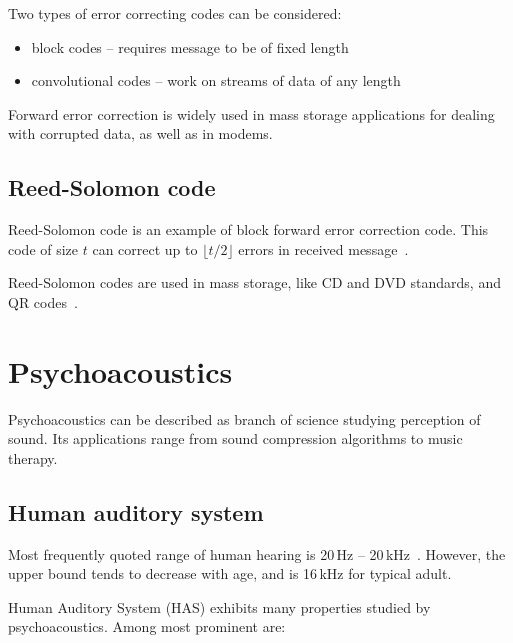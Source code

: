 \documentclass[english,bachelor,a4paper,oneside]{ppfcmthesis}
\begin{document}
Two types of error correcting codes can be considered:

\begin{itemize}
\item block codes -- requires message to be of fixed length
\item convolutional codes -- work on streams of data of any length
\end{itemize}

Forward error correction is widely used in mass storage applications for dealing with corrupted data, as well as in modems.

\subsection{Reed-Solomon code}
\label{subsec:reedsolomon}

Reed-Solomon code is an example of block forward error correction code. This code of size $t$ can correct up to $\lfloor t/2\rfloor$ errors in received message~\cite{ReedSolo}.


Reed-Solomon codes are used in mass storage, like CD and DVD standards, and QR codes~\cite{ReedSoloApplications}.

\section{Psychoacoustics}

Psychoacoustics can be described as branch of science studying perception of sound. Its applications range from sound compression algorithms to music therapy.

\subsection{Human auditory system}
\label{subsec:human-auditory}

Most frequently quoted range of human hearing is 20\,Hz -- 20\,kHz~\cite{HearPsych}.
However, the upper bound tends to decrease with age, and is 16\,kHz for typical adult.

Human Auditory System (HAS) exhibits many properties studied by psychoacoustics. Among most prominent are:
\end{document}

